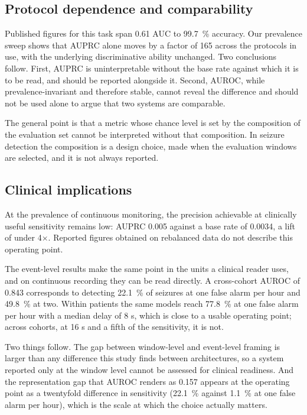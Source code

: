 \documentclass[11pt,a4paper]{article}
\begin{document}
\subsection{Protocol dependence and comparability}

Published figures for this task span 0.61 AUC to \SI{99.7}{\percent} accuracy.
Our prevalence sweep shows that AUPRC alone moves by a factor of 165 across
the protocols in use, with the underlying discriminative ability unchanged.
Two conclusions follow. First, AUPRC is uninterpretable without the base
rate against which it is to be read, and should be reported alongside it. Second, AUROC, while prevalence-invariant
and therefore stable, cannot reveal the difference and should not be used
alone to argue that two systems are comparable.

The general point is that a metric whose chance level is set by the
composition of the evaluation set cannot be interpreted without that
composition. In seizure detection the composition is a design choice, made
when the evaluation windows are selected, and it is not always reported.

\subsection{Clinical implications}

At the prevalence of continuous monitoring, the precision achievable at
clinically useful sensitivity remains low: AUPRC 0.005 against a base rate of
0.0034, a lift of under 4$\times$. Reported figures obtained on rebalanced
data do not describe this operating point.

The event-level results make the same point in the units a clinical reader
uses, and on continuous recording they can be read directly. A cross-cohort
AUROC of 0.843 corresponds to detecting \SI{22.1}{\percent} of seizures at
one false alarm per hour and \SI{49.8}{\percent} at two. Within patients the
same models reach \SI{77.8}{\percent} at one false alarm per hour with a
median delay of 8 s, which is close to a usable operating point; across
cohorts, at 16 s and a fifth of the sensitivity, it is not.

Two things follow. The gap between window-level and event-level framing is
larger than any difference this study finds between architectures, so a
system reported only at the window level cannot be assessed for clinical
readiness. And the representation gap that AUROC renders as 0.157 appears at
the operating point as a twentyfold difference in sensitivity
(\SI{22.1}{\percent} against \SI{1.1}{\percent} at one false alarm per hour),
which is the scale at which the choice actually matters.
\end{document}

